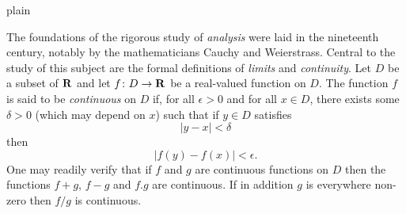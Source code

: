 plain

The foundations of the rigorous study of {\it analysis}
were laid in the nineteenth century, notably by the
mathematicians Cauchy and Weierstrass. Central to the
study of this subject are the formal definitions of
{\it limits} and {\it continuity}.
Let $D$ be a subset of $\bf R$ and let
$f \colon D \to {\bf R}$ be a real-valued function on
$D$. The function $f$ is said to be {\it continuous} on
$D$ if, for all $\epsilon > 0$ and for all $x \in D$,
there exists some $\delta > 0$ (which may depend on $x$)
such that if $y \in D$ satisfies
$$|y - x| < \delta$$
then
$$|f(y) - f(x)| < \epsilon.$$
One may readily verify that if $f$ and $g$ are continuous
functions on $D$ then the functions $f+g$, $f-g$ and
$f.g$ are continuous. If in addition $g$ is everywhere
non-zero then $f/g$ is continuous.

\bye
